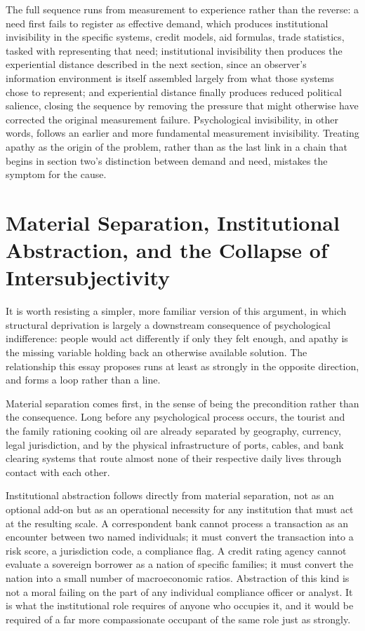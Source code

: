 \documentclass[11pt]{article}
\begin{document}
The full sequence runs from measurement to experience rather than the reverse: a need first fails to register as effective demand, which produces institutional invisibility in the specific systems, credit models, aid formulas, trade statistics, tasked with representing that need; institutional invisibility then produces the experiential distance described in the next section, since an observer's information environment is itself assembled largely from what those systems chose to represent; and experiential distance finally produces reduced political salience, closing the sequence by removing the pressure that might otherwise have corrected the original measurement failure. Psychological invisibility, in other words, follows an earlier and more fundamental measurement invisibility. Treating apathy as the origin of the problem, rather than as the last link in a chain that begins in section two's distinction between demand and need, mistakes the symptom for the cause.

\section{Material Separation, Institutional Abstraction, and the Collapse of Intersubjectivity}

It is worth resisting a simpler, more familiar version of this argument, in which structural deprivation is largely a downstream consequence of psychological indifference: people would act differently if only they felt enough, and apathy is the missing variable holding back an otherwise available solution. The relationship this essay proposes runs at least as strongly in the opposite direction, and forms a loop rather than a line.

Material separation comes first, in the sense of being the precondition rather than the consequence. Long before any psychological process occurs, the tourist and the family rationing cooking oil are already separated by geography, currency, legal jurisdiction, and by the physical infrastructure of ports, cables, and bank clearing systems that route almost none of their respective daily lives through contact with each other.

Institutional abstraction follows directly from material separation, not as an optional add-on but as an operational necessity for any institution that must act at the resulting scale. A correspondent bank cannot process a transaction as an encounter between two named individuals; it must convert the transaction into a risk score, a jurisdiction code, a compliance flag. A credit rating agency cannot evaluate a sovereign borrower as a nation of specific families; it must convert the nation into a small number of macroeconomic ratios. Abstraction of this kind is not a moral failing on the part of any individual compliance officer or analyst. It is what the institutional role requires of anyone who occupies it, and it would be required of a far more compassionate occupant of the same role just as strongly.
\end{document}
